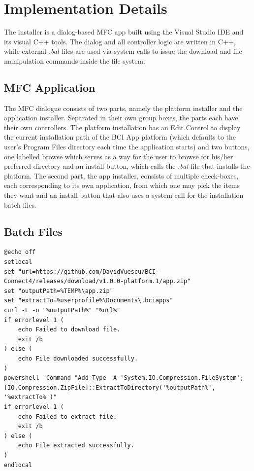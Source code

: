 \section{Implementation Details}
The installer is a dialog-based MFC app built using the Visual Studio IDE and its visual C++ tools. The dialog and all controller logic are written in C++, while external \textit{.bat} files are used via system calls to issue the download and file manipulation commands inside the file system.

\subsection{MFC Application}
The MFC dialogue consists of two parts, namely the platform installer and the application installer. Separated in their own group boxes, the parts each have their own controllers. The platform installation has an Edit Control to display the current installation path of the BCI App platform (which defaults to the user's Program Files directory each time the application starts) and two buttons, one labelled browse which serves as a way for the user to browse for his/her preferred directory and an install button, which calls the \textit{.bat} file that installs the platform. The second part, the app installer, consists of multiple check-boxes, each corresponding to its own application, from which one may pick the items they want and an install button that also uses a system call for the installation batch files. 

\subsection{Batch Files}
\begin{lstlisting}[language={[Sharp]C}, caption={c4.bat, the script file used for installing the Connect4 Game}, label={Script}]
@echo off
setlocal
set "url=https://github.com/DavidVuescu/BCI-Connect4/releases/download/v1.0.0-platform.1/app.zip"
set "outputPath=%TEMP%\app.zip"
set "extractTo=%userprofile%\Documents\.bciapps"
curl -L -o "%outputPath%" "%url%"
if errorlevel 1 (
    echo Failed to download file.
    exit /b
) else (
    echo File downloaded successfully.
)
powershell -Command "Add-Type -A 'System.IO.Compression.FileSystem'; [IO.Compression.ZipFile]::ExtractToDirectory('%outputPath%', '%extractTo%')"
if errorlevel 1 (
    echo Failed to extract file.
    exit /b
) else (
    echo File extracted successfully.
)
endlocal
\end{lstlisting}


